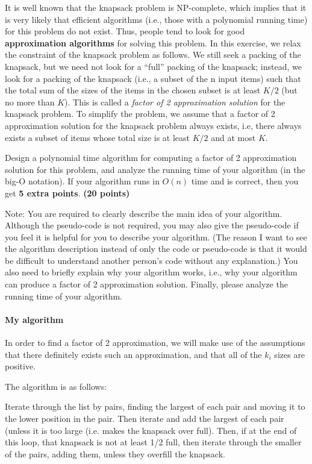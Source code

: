 \documentclass{article}
\begin{document}
It is well known that the knapsack problem is NP-complete, which
implies that it is very likely that efficient algorithms (i.e., those
with a polynomial running time) for this problem do not exist. Thus,
people tend to look for good {\bf approximation algorithms} for
solving this problem. In this exercise, we relax the constraint of the
knapsack problem as follows. We still seek a packing of the knapsack,
but we need not look for a ``full'' packing of the knapsack; instead,
we look for a packing of the knapsack (i.e., a subset of the n input
items) such that the total sum of the sizes of the items in the chosen
subset is at least $K/2$ (but no more than $K$). This is called a
\emph{factor of 2 approximation solution} for the knapsack problem. To 
simplify the problem, we assume that a factor of 2 approximation
solution for the knapsack problem always exists, i.e, there always
exists a subset of items whose total size is at least $K/2$ and at
most $K$. 

Design a polynomial time algorithm for computing a factor of 2
approximation solution for this problem, and analyze the running time
of your algorithm (in the big-O notation). If your algorithm runs in
$O(n)$ time and is correct, then you get {\bf 5 extra points}. {\bf(20
  points)} 

Note: You are required to clearly describe the main idea of your
algorithm. Although the pseudo-code is not required, you may also give
the pseudo-code if you feel it is helpful for you to describe your
algorithm. (The reason I want to see the algorithm description instead
of only the code or pseudo-code is that it would be difficult to
understand another person's code without any explanation.) You also
need to briefly explain why your algorithm works, i.e., why your
algorithm can produce a factor of 2 approximation solution. Finally,
please analyze the running time of your algorithm. 

\paragraph{My algorithm}





In order to find a factor of 2 approximation, we will make use of the
assumptions that there definitely exists such an approximation, and
that all of the $k_i$ sizes are positive.

The algorithm is as follows:

Iterate through the list by pairs, finding the largest of each pair
and moving it to the lower position in the pair.
Then iterate and add the largest of each pair (unless it is too large
(i.e. makes the knapsack over full).
Then, if at the end of this loop, that knapsack is not at least 1/2
full, then iterate through the smaller of the pairs, adding them,
unless they overfill the knapsack.
\end{document}
